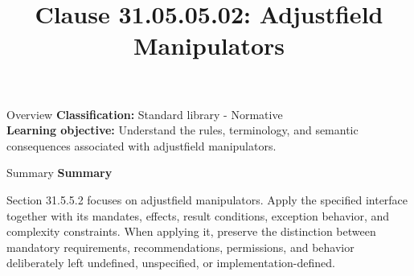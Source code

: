 \documentclass[10pt,letterpaper]{article}
\title{Clause 31.05.05.02: Adjustfield Manipulators}
\author{}
\date{}
\begin{document}
\maketitle
\begin{CornellOverviewBox}{Overview}
\textbf{Classification:} Standard library - Normative\\[2pt]
\textbf{Learning objective:} Understand the rules, terminology, and semantic consequences associated with adjustfield manipulators.
\end{CornellOverviewBox}\begin{CornellSummaryBox}{Summary}
{\sffamily\bfseries\color{Accent} Summary}\par\vspace{3pt}Section 31.5.5.2 focuses on adjustfield manipulators. Apply the specified interface together with its mandates, effects, result conditions, exception behavior, and complexity constraints. When applying it, preserve the distinction between mandatory requirements, recommendations, permissions, and behavior deliberately left undefined, unspecified, or implementation-defined.
\end{CornellSummaryBox}
\end{document}
